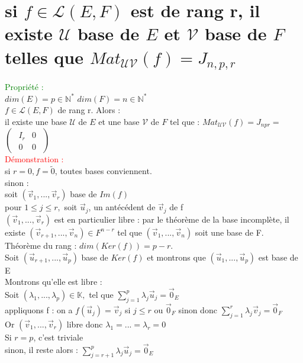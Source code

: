 \documentclass{article}
\begin{document}
        \section{si $f \in \mathcal L(E,F)$ est de rang r, il existe $\mathcal U$ base de $E$ et $\mathcal V$ base de $F$ telles que $Mat_{\mathcal{UV}}(f)=J_{n,p,r}$}
				\textcolor{green}{Propriété :} \\
				$dim(E)=p \in \mathbb N^*$ $dim(F)=n \in \mathbb N^*$ \\
				$f \in \mathcal L (E,F)$ de rang r. Alors : \\
				il existe une base $\mathcal U$ de $E$ et une base $\mathcal V$ de $F$ tel que :  $Mat_{\mathcal{UV}}(f)=J_{npr}=$ $\begin{pmatrix}\begin{array}{c|c}I _r& 0 \\ \hline0 & 0 \end{array}\end{pmatrix}$ \\
				\textcolor{red}{Démonstration :} \\
				si $r=0, f=\tilde{0}$, toutes bases conviennent. \\
				sinon : \\
				soit $(\vec v_1,..., \vec v_r)$ base de $Im(f)$ \\
				pour $1 \leq j \leq r, $ soit $\vec u_j$, un antécédent de $\vec v_j$ de f \\
				$(\vec v_1,..., \vec v_r)$ est en particulier libre : par le théorème de la base incomplète, il existe $(\vec v_{r+1},..., \vec v_n) \in F^{n-r}$ tel que $(\vec v_1,...,\vec v_n)$ soit une base de F. \\
				Théorème du rang : $dim(Ker(f))=p-r$. \\
				Soit $(\vec u_{r+1},..., \vec u_p)$ base de $Ker(f)$ et montrons que $(\vec u_1,..., \vec u_p)$ est base de E \\
				Montrons qu'elle est libre : \\
				Soit $(\lambda_1,...,\lambda_p) \in \mathbb K,$ tel que $\sum_{j=1}^p \lambda_j \vec u_j = \vec 0_E$ \\
				appliquons f : on a $f(\vec u_j)=\vec v_j$ si $j \leq r$ ou $\vec 0_F$ sinon donc $\sum_{j=1}^r \lambda_j \vec v_j=\vec 0_F$ \\
				Or $(\vec v_1,..., \vec v_r)$ libre donc $\lambda_1=...= \lambda_r=0$ \\
				Si $r=p$, c'est triviale \\
				sinon, il reste alors : $\sum_{j=r+1}^p \lambda_j \vec u_j= \vec 0_E$ \\
\end{document}
